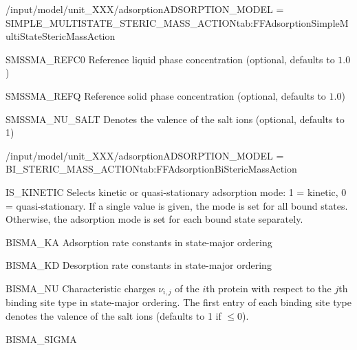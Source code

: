 \begin{condsubgroup}{/input/model/unit\_XXX/adsorption}{ADSORPTION\_MODEL = SIMPLE\_MULTISTATE\_STERIC\_MASS\_ACTION}{tab:FFAdsorptionSimpleMultiStateStericMassAction}
\begin{dataset}[unit=\si{\mol\per\raiseto{3}\metre\of{MP}}, type = double, range={$> 0$}, length={1}]{SMSSMA\_REFC0}
    Reference liquid phase concentration (optional, defaults to $1.0$) 
  \end{dataset} 
  \begin{dataset}[unit=\si{\mol\per\raiseto{3}\metre\of{SP}}, type = double, range={$> 0$}, length={1}]{SMSSMA\_REFQ} 
    Reference solid phase concentration (optional, defaults to $1.0$)
  \end{dataset} 
  \begin{dataset}[type = double, range={$\geq 0$}, length={\texttt{NCOMP}}]{SMSSMA\_NU\_SALT}
    Denotes the valence of the salt ions (optional, defaults to 1)
  \end{dataset} 
\end{condsubgroup}

\begin{condsubgroup}{/input/model/unit\_XXX/adsorption}{ADSORPTION\_MODEL = BI\_STERIC\_MASS\_ACTION}{tab:FFAdsorptionBiStericMassAction}
\begin{dataset}[type=int,range={$\{ 0,1 \}$},length={1 / \texttt{NTOTALBND}}]{IS\_KINETIC}
    Selects kinetic or quasi-stationary adsorption mode: 1 = kinetic, 0 = quasi-stationary.
    If a single value is given, the mode is set for all bound states.
    Otherwise, the adsorption mode is set for each bound state separately.
  \end{dataset}
  \begin{dataset}[unit=\si{\raiseto{3}\metre\of{MP}\per\raiseto{3}\metre\of{SP}\per\second}, type = double, range={$\geq 0.0$}, length={$\texttt{NSTATES} \cdot \texttt{NCOMP}$}]{BISMA\_KA} 
    Adsorption rate constants in state-major ordering
  \end{dataset} 
  \begin{dataset}[unit=\si{\per\second}, type = double, range={$\geq 0.0$}, length={$\texttt{NSTATES} \cdot \texttt{NCOMP}$}]{BISMA\_KD} 
    Desorption rate constants in state-major ordering
  \end{dataset} 
  \begin{dataset}[unit=\si{\per\second}, type = double, range={$\geq 0.0$}, length={$\texttt{NSTATES} \cdot \texttt{NCOMP}$}]{BISMA\_NU} 
    Characteristic charges $\nu_{i,j}$ of the $i$th protein with respect to the $j$th binding site type in state-major ordering.
    The first entry of each binding site type denotes the valence of the salt ions (defaults to 1 if $\leq 0$).
  \end{dataset} 
  \begin{dataset}[unit=\si{\per\second}, type = double, range={$\geq 0.0$}, length={$\texttt{NSTATES} \cdot \texttt{NCOMP}$}]{BISMA\_SIGMA} 

\end{dataset}
\end{condsubgroup}
